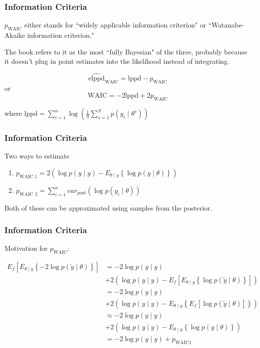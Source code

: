 \documentclass{beamer}
\begin{document}
\begin{frame}
\frametitle{Information Criteria}

$p_{\text{WAIC}}$ either stands for ``widely applicable information criterion" or ``Watanabe-Akaike information criterion." 
\newline

The book refers to it as the most ``fully Bayesian" of the three, probably because it doesn't plug in point estimates into the likelihood instead of integrating.

\[
\widehat{\text{elppd}}_{\text{WAIC}} = \text{lppd} - p_{\text{WAIC}}
\]
or
\[
\text{WAIC} = -2\text{lppd} + 2 p_{\text{WAIC}}
\]

where $ \text{lppd} = \sum_{i=1}^n \log \left(\frac{1}{S}\sum_{s=1}^S p(y_i \mid \theta^s) \right)$

\end{frame}

\begin{frame}
\frametitle{Information Criteria}

Two ways to estimate 

\begin{enumerate}
\item $p_{\text{WAIC 1}} = 2\left( \log p(y \mid y) - E_{\theta \mid y} \left\{  \log p(y \mid \theta) \right\} \right)$
\item $p_{\text{WAIC 2}} = \sum_{i=1}^n var_{\text{post}}(\log p(y_i \mid \theta))$
\end{enumerate}

Both of these can be approximated using samples from the posterior.

\end{frame}


\begin{frame}
\frametitle{Information Criteria}

Motivation for $p_{\text{WAIC}}$:

\begin{align*}
E_f\left[E_{\theta \mid y} \left\{-2  \log p(\tilde{y} \mid \theta) \right\} \right] &= - 2\log p(y \mid y) \\
&+ 2\left( \log p(y \mid y) - E_f\left[E_{\theta \mid y} \left\{ \log p(\tilde{y} \mid \theta) \right\} \right]\right) \\
&= - 2\log p(y \mid y) \\
&+ 2\left( \log p(y \mid y) - E_{\theta \mid y} \left\{ E_f\left[ \log p(\tilde{y} \mid \theta) \right]\right\} \right) \\
&\approx - 2\log p(y \mid y) \\
&+ 2\left( \log p(y \mid y) - E_{\theta \mid y} \left\{  \log p(y \mid \theta) \right\} \right) \\
&= - 2\log p(y \mid y) + p_{\text{WAIC} 1}
\end{align*}



\end{frame}
\end{document}

